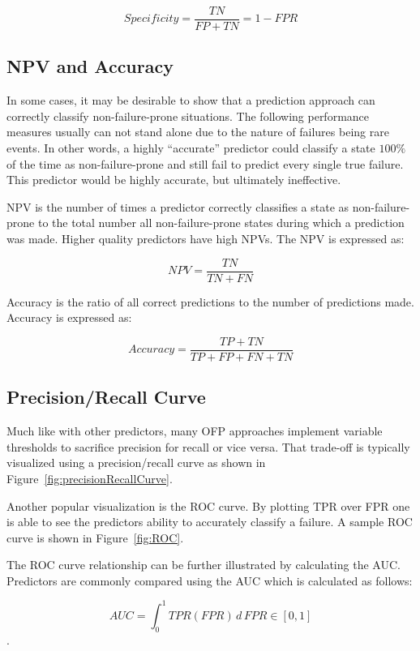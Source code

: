 \[ Specificity 
	= \dfrac{TN}{FP + TN} = 1 - FPR
\]

\subsection{\ac{NPV} and Accuracy}
In some cases, it may be desirable to show that a prediction approach can
correctly classify non-failure-prone situations.  The following performance
measures usually can not stand alone due to the nature of failures being rare
events.  In other words, a highly ``accurate'' predictor could classify a state
$100\%$ of the time as non-failure-prone and still fail to predict every single
true failure.  This predictor would be highly accurate, but ultimately
ineffective.

\ac{NPV} is the number of times a predictor correctly classifies a state as
non-failure-prone to the total number all non-failure-prone states during which
a prediction was made.  Higher quality predictors have high \ac{NPV}s.  The
\ac{NPV} is expressed as:

\[ \mathit{NPV}
	= \dfrac{TN}{TN + FN}
\]

Accuracy is the ratio of all correct predictions to the number of predictions
made.  Accuracy is expressed as:

\[ Accuracy 
	= \dfrac{TP + TN}{TP + FP + FN + TN}
\]

\subsection{Precision/Recall Curve}
Much like with other predictors, many \ac{OFP} approaches implement variable
thresholds to sacrifice precision for recall or vice versa.  That trade-off is
typically visualized using a precision/recall curve as shown in
Figure~\ref{fig:precisionRecallCurve}.

\figprecisionRecallCurve{3in}

Another popular visualization is the \ac{ROC} curve.  By plotting \ac{TPR} over
\ac{FPR} one is able to see the predictors ability to accurately classify a
failure.  A sample \ac{ROC} curve is shown in Figure~\ref{fig:ROC}.

\figROC{3in}

The \ac{ROC} curve relationship can be further illustrated by calculating the
\ac{AUC}.  Predictors are commonly compared using the \ac{AUC} which is
calculated as follows:

$$AUC = \int_{0}^{1} \mathit{TPR}(\mathit{FPR}) \,d\,\mathit{FPR} \in [0,1]$$.

